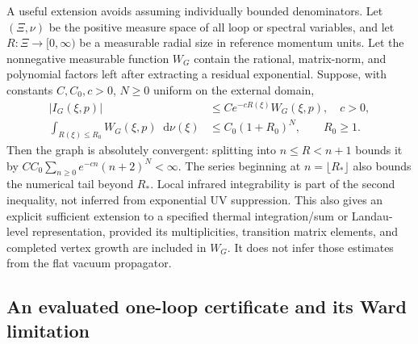 \documentclass[final,5p,times,twocolumn,numbers,nopreprintline]{elsarticle}
\numberwithin{equation}{section}
\theoremstyle{definition}
\theoremstyle{remark}
\newcommand{\dd}{\mathop{}\!\mathrm d}
\begin{document}
A useful extension avoids assuming individually bounded denominators.
Let \((\Xi,\nu)\) be the positive measure space of all loop or spectral
variables, and let \(R:\Xi\to[0,\infty)\) be a measurable radial size
in reference momentum units. Let the nonnegative measurable function
\(W_G\) contain the rational, matrix-norm, and polynomial factors left
after extracting a residual exponential. Suppose, with constants
\(C,C_0,c>0\), \(N\geq0\) uniform on the external domain,
\begin{equation}
\begin{aligned}
 |I_G(\xi,p)|&\leq C e^{-cR(\xi)}W_G(\xi,p),\quad c>0,\\
 \int_{R(\xi)\leq R_0}W_G(\xi,p)\dd\nu(\xi)
    &\leq C_0(1+R_0)^N,\qquad R_0\geq1.
\end{aligned}
\label{eq:OQED-spectral-volume-certificate}
\end{equation}
Then the graph is absolutely convergent: splitting into
\(n\leq R<n+1\) bounds it by
\(CC_0\sum_{n\geq0}e^{-cn}(n+2)^N<\infty\).
The series beginning at \(n=\lfloor R_*\rfloor\) also bounds the
numerical tail beyond \(R_*\). Local infrared integrability is part of the
second inequality, not inferred from exponential UV suppression.
This also gives an explicit sufficient extension to a specified
thermal integration/sum or Landau-level representation, provided its
multiplicities, transition matrix elements, and completed vertex growth
are included in \(W_G\). It does not infer those estimates from the
flat vacuum propagator.

\subsection{An evaluated one-loop certificate and its Ward limitation}
\label{sec:OQED-one-loop}
\end{document}
